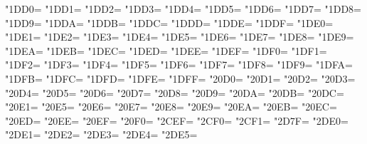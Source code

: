 \XeTeXcharclass"1DD0=\KclassCM
\XeTeXcharclass"1DD1=\KclassCM
\XeTeXcharclass"1DD2=\KclassCM
\XeTeXcharclass"1DD3=\KclassCM
\XeTeXcharclass"1DD4=\KclassCM
\XeTeXcharclass"1DD5=\KclassCM
\XeTeXcharclass"1DD6=\KclassCM
\XeTeXcharclass"1DD7=\KclassCM
\XeTeXcharclass"1DD8=\KclassCM
\XeTeXcharclass"1DD9=\KclassCM
\XeTeXcharclass"1DDA=\KclassCM
\XeTeXcharclass"1DDB=\KclassCM
\XeTeXcharclass"1DDC=\KclassCM
\XeTeXcharclass"1DDD=\KclassCM
\XeTeXcharclass"1DDE=\KclassCM
\XeTeXcharclass"1DDF=\KclassCM
\XeTeXcharclass"1DE0=\KclassCM
\XeTeXcharclass"1DE1=\KclassCM
\XeTeXcharclass"1DE2=\KclassCM
\XeTeXcharclass"1DE3=\KclassCM
\XeTeXcharclass"1DE4=\KclassCM
\XeTeXcharclass"1DE5=\KclassCM
\XeTeXcharclass"1DE6=\KclassCM
\XeTeXcharclass"1DE7=\KclassCM
\XeTeXcharclass"1DE8=\KclassCM
\XeTeXcharclass"1DE9=\KclassCM
\XeTeXcharclass"1DEA=\KclassCM
\XeTeXcharclass"1DEB=\KclassCM
\XeTeXcharclass"1DEC=\KclassCM
\XeTeXcharclass"1DED=\KclassCM
\XeTeXcharclass"1DEE=\KclassCM
\XeTeXcharclass"1DEF=\KclassCM
\XeTeXcharclass"1DF0=\KclassCM
\XeTeXcharclass"1DF1=\KclassCM
\XeTeXcharclass"1DF2=\KclassCM
\XeTeXcharclass"1DF3=\KclassCM
\XeTeXcharclass"1DF4=\KclassCM
\XeTeXcharclass"1DF5=\KclassCM
\XeTeXcharclass"1DF6=\KclassCM
\XeTeXcharclass"1DF7=\KclassCM
\XeTeXcharclass"1DF8=\KclassCM
\XeTeXcharclass"1DF9=\KclassCM
\XeTeXcharclass"1DFA=\KclassCM
\XeTeXcharclass"1DFB=\KclassCM
\XeTeXcharclass"1DFC=\KclassCM
\XeTeXcharclass"1DFD=\KclassCM
\XeTeXcharclass"1DFE=\KclassCM
\XeTeXcharclass"1DFF=\KclassCM
\XeTeXcharclass"20D0=\KclassCM
\XeTeXcharclass"20D1=\KclassCM
\XeTeXcharclass"20D2=\KclassCM
\XeTeXcharclass"20D3=\KclassCM
\XeTeXcharclass"20D4=\KclassCM
\XeTeXcharclass"20D5=\KclassCM
\XeTeXcharclass"20D6=\KclassCM
\XeTeXcharclass"20D7=\KclassCM
\XeTeXcharclass"20D8=\KclassCM
\XeTeXcharclass"20D9=\KclassCM
\XeTeXcharclass"20DA=\KclassCM
\XeTeXcharclass"20DB=\KclassCM
\XeTeXcharclass"20DC=\KclassCM
\XeTeXcharclass"20E1=\KclassCM
\XeTeXcharclass"20E5=\KclassCM
\XeTeXcharclass"20E6=\KclassCM
\XeTeXcharclass"20E7=\KclassCM
\XeTeXcharclass"20E8=\KclassCM
\XeTeXcharclass"20E9=\KclassCM
\XeTeXcharclass"20EA=\KclassCM
\XeTeXcharclass"20EB=\KclassCM
\XeTeXcharclass"20EC=\KclassCM
\XeTeXcharclass"20ED=\KclassCM
\XeTeXcharclass"20EE=\KclassCM
\XeTeXcharclass"20EF=\KclassCM
\XeTeXcharclass"20F0=\KclassCM
\XeTeXcharclass"2CEF=\KclassCM
\XeTeXcharclass"2CF0=\KclassCM
\XeTeXcharclass"2CF1=\KclassCM
\XeTeXcharclass"2D7F=\KclassCM
\XeTeXcharclass"2DE0=\KclassCM
\XeTeXcharclass"2DE1=\KclassCM
\XeTeXcharclass"2DE2=\KclassCM
\XeTeXcharclass"2DE3=\KclassCM
\XeTeXcharclass"2DE4=\KclassCM
\XeTeXcharclass"2DE5=\KclassCM
